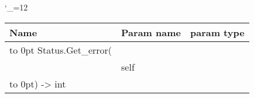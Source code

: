 \begingroup \catcode`\_=12 \tt
\begin{tabular}{lll}
\toprule
\textrm{Name}&\textrm{Param name}&\textrm{param type}\\
\midrule
\hbox to 0pt {Status.Get_error(\hss}\\
& self\\
\hbox to 0pt{) -> int\hss}\\
\bottomrule
\end{tabular}
\endgroup
